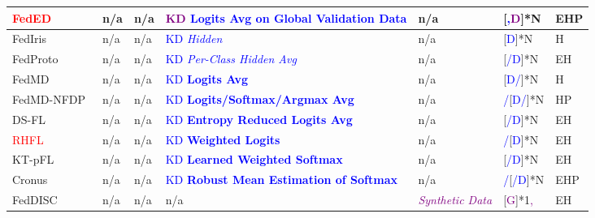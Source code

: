 \begin{table}[htp]
\begin{tabular}{|p{2.05cm}|p{1.36cm}|p{1.56cm}|p{4.35cm}|p{2.77cm}|p{1.5cm}|p{0.35cm}|}
    \rowcolor[gray]{.9}
    \textcolor{red}{FedED}~\cite{sui2020feded} & n/a & n/a & \textcolor{purple}{KD} \textcolor{blue}{\textbf{Logits Avg on Global Validation Data}} & n/a &[\textcolor{blue}{,}\textcolor{purple}{D}]*N & EHP \\ \hline %

    FedIris~\cite{luo2022fediris} & n/a & n/a & \textcolor{blue}{KD \textit{Hidden}} & n/a &[\textcolor{blue}{D}]*N & H \\ \hline %

    \rowcolor[gray]{.9}
    FedProto~\cite{tan2022fedproto} & n/a & n/a & \textcolor{blue}{KD \textit{Per-Class Hidden Avg}} & n/a &[\textcolor{blue}{/D}]*N & EH \\ \hline %

    FedMD~\cite{li2019fedmd} & n/a & n/a & \textcolor{blue}{KD \textbf{Logits Avg}} & n/a &[\textcolor{blue}{D/}]*N & H \\ \hline %

    \rowcolor[gray]{.9}
    FedMD-NFDP~\cite{sun2020federated}& n/a & n/a & \textcolor{blue}{KD \textbf{Logits/Softmax/Argmax Avg}} & n/a & \textcolor{blue}{/}[\textcolor{blue}{D/}]*N & HP \\ \hline %

    DS-FL~\cite{itahara2021distillation}& n/a & n/a & \textcolor{blue}{KD \textbf{Entropy Reduced Logits Avg}} & n/a &[\textcolor{blue}{/D}]*N & EH \\ \hline %

    \rowcolor[gray]{.9}
    \textcolor{red}{RHFL}~\cite{fang2022robust} & n/a & n/a & \textcolor{blue}{KD \textbf{Weighted Logits}} & n/a & \textcolor{blue}{/}[\textcolor{blue}{D}]*N & EH \\ \hline

    KT-pFL~\cite{zhang2021parameterized} & n/a & n/a & \textcolor{blue}{KD \textbf{Learned Weighted Softmax}} & n/a &[\textcolor{blue}{/D}]*N & EH \\ \hline

    \rowcolor[gray]{.9}
    Cronus~\cite{chang2021cronus} & n/a & n/a & \textcolor{blue}{KD} \textcolor{blue}{\textbf{Robust Mean Estimation of Softmax}} & n/a & \textcolor{blue}{/}[\textcolor{blue}{/D}]*N & EHP \\ \hline
    
    FedDISC~\cite{yang2023exploring} & n/a & n/a & n/a & \textcolor{purple}{\textit{Synthetic Data}} &[\textcolor{purple}{G}]*1\textcolor{purple}{,} & EH \\ \hline


\end{tabular}
\end{table}
